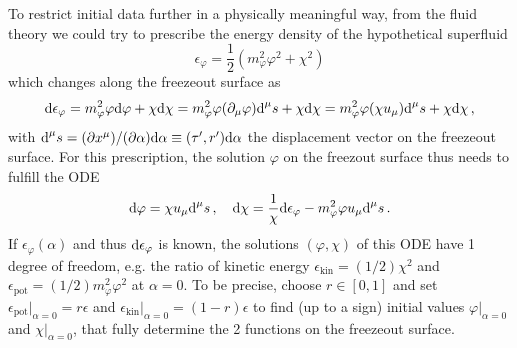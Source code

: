 To restrict initial data further in a physically meaningful way, from the fluid theory we could try to prescribe the energy density of the hypothetical superfluid
\begin{equation}
    \epsilon_\varphi=\frac{1}{2}(m_\varphi^2\varphi^2+\chi^2)
\end{equation}
which changes along the freezeout surface as
    \begin{equation}
        \text{d}\epsilon_{\varphi}=m_\varphi^2\varphi\text{d}\varphi+\chi\text{d}\chi=m_\varphi^2\varphi(\partial_\mu\varphi)\text{d}^\mu s+\chi\text{d}\chi=m_\varphi^2\varphi(\chi u_\mu)\text{d}^\mu s+\chi\text{d}\chi\,,
    \end{equation}
with ${\text{d}^\mu s=(\partial x^\mu)/(\partial\alpha)\text{d}\alpha\equiv(\tau^\prime,r^\prime)\text{d}\alpha}$ the displacement vector on the freezeout surface. For this prescription, the solution $\varphi$ on the freezout surface thus needs to fulfill the ODE
\begin{equation}
    \text{d}\varphi=\chi u_\mu\text{d}^\mu s\,,\quad
    \text{d}\chi=\frac{1}{\chi}\text{d}\epsilon_\varphi-m_\varphi^2\varphi u_\mu\text{d}^\mu s\,.
    \label{eq:InitialConditions_ODE}
\end{equation}
If $\epsilon_\varphi(\alpha)$ and thus $\text{d}\epsilon_\varphi$ is known, the solutions $(\varphi,\chi)$ of this ODE have 1 degree of freedom, e.g. the ratio of kinetic energy ${\epsilon_{\text{kin}}=(1/2)\chi^2}$ and ${\epsilon_{\text{pot}}=(1/2)m_\varphi^2\varphi^2}$ at $\alpha=0$. To be precise, choose ${r\in[0,1]}$ and set ${\epsilon_{\text{pot}}\big\vert_{\alpha=0}=r\epsilon}$ and ${\epsilon_{\text{kin}}\big\vert_{\alpha=0}=(1-r)\epsilon}$ to find (up to a sign) initial values $\varphi\vert_{\alpha=0}$ and $\chi\vert_{\alpha=0}$, that fully determine the 2 functions on the freezeout surface.

